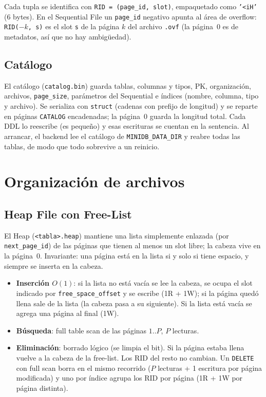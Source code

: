 \documentclass[11pt,a4paper]{article}
\newcommand{\code}[1]{\texttt{#1}}
\begin{document}
Cada tupla se identifica con \code{RID = (page\_id, slot)}, empaquetado como \code{'<iH'} (6 bytes).
En el Sequential File un \code{page\_id} negativo apunta al área de overflow: \code{RID($-k$, s)} es el
slot \code{s} de la página $k$ del archivo \code{.ovf} (la página~0 es de metadatos, así que no hay
ambigüedad).

\subsection{Catálogo}

El catálogo (\code{catalog.bin}) guarda tablas, columnas y tipos, PK, organización, archivos,
\code{page\_size}, parámetros del Sequential e índices (nombre, columna, tipo y archivo). Se serializa
con \code{struct} (cadenas con prefijo de longitud) y se reparte en páginas \code{CATALOG}
encadenadas; la página~0 guarda la longitud total. Cada DDL lo reescribe (es pequeño) y esas
escrituras se cuentan en la sentencia. Al arrancar, el backend lee el catálogo de
\code{MINIDB\_DATA\_DIR} y reabre todas las tablas, de modo que todo sobrevive a un reinicio.

\section{Organización de archivos}
\label{sec:archivos}

\subsection{Heap File con Free-List}

El Heap (\code{<tabla>.heap}) mantiene una lista simplemente enlazada (por \code{next\_page\_id}) de las
páginas que tienen al menos un slot libre; la cabeza vive en la página~0. Invariante: una página está
en la lista si y solo si tiene espacio, y siempre se inserta en la cabeza.

\begin{itemize}
\item \textbf{Inserción $O(1)$}: si la lista no está vacía se lee la cabeza, se ocupa el slot indicado
  por \code{free\_space\_offset} y se escribe (1R + 1W); si la página quedó llena sale de la lista
  (la cabeza pasa a su siguiente). Si la lista está vacía se agrega una página al final (1W).
\item \textbf{Búsqueda}: full table scan de las páginas $1..P$, $P$ lecturas.
\item \textbf{Eliminación}: borrado lógico (se limpia el bit). Si la página estaba llena vuelve a la
  cabeza de la free-list. Los RID del resto no cambian. Un \code{DELETE} con full scan borra en el
  mismo recorrido ($P$ lecturas + 1 escritura por página modificada) y uno por índice agrupa los RID
  por página (1R + 1W por página distinta).
\end{itemize}
\end{document}
